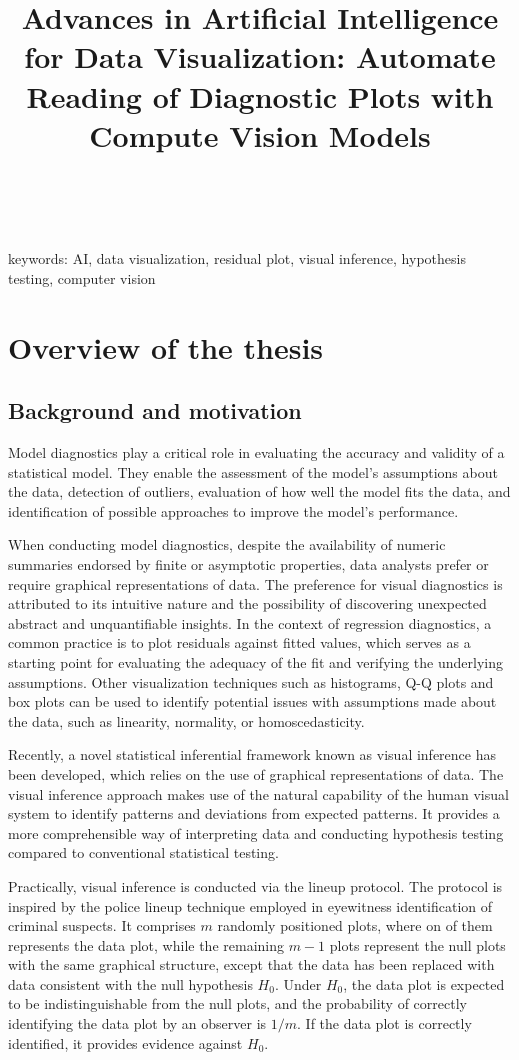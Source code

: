 \documentclass[11pt,a4paper,]{article}
\title{Advances in Artificial Intelligence for Data Visualization: Automate Reading of Diagnostic Plots with Compute Vision Models}
\author{\sf{\Large\textbf{Weihao (Patrick) Li}\\\large PhD student\\[0.5cm]}}
\date{\sf\Date~\Month~\Year}
\makeatletter
\def\titlepage{\front{\expandafter{\@title}}{\@author}{\@organization}}
\makeatother
\begin{document}
\titlepage

keywords:
AI, data visualization, residual plot, visual inference, hypothesis testing, computer vision

\hypertarget{overview-of-the-thesis}{%
\section{Overview of the thesis}\label{overview-of-the-thesis}}

\hypertarget{background-and-motivation}{%
\subsection{Background and motivation}\label{background-and-motivation}}

Model diagnostics play a critical role in evaluating the accuracy and validity of a statistical model. They enable the assessment of the model's assumptions about the data, detection of outliers, evaluation of how well the model fits the data, and identification of possible approaches to improve the model's performance.

When conducting model diagnostics, despite the availability of numeric summaries endorsed by finite or asymptotic properties, data analysts prefer or require graphical representations of data. The preference for visual diagnostics is attributed to its intuitive nature and the possibility of discovering unexpected abstract and unquantifiable insights. In the context of regression diagnostics, a common practice is to plot residuals against fitted values, which serves as a starting point for evaluating the adequacy of the fit and verifying the underlying assumptions. Other visualization techniques such as histograms, Q-Q plots and box plots can be used to identify potential issues with assumptions made about the data, such as linearity, normality, or homoscedasticity.

Recently, a novel statistical inferential framework known as visual inference \autocite{buja_statistical_2009} has been developed, which relies on the use of graphical representations of data. The visual inference approach makes use of the natural capability of the human visual system to identify patterns and deviations from expected patterns. It provides a more comprehensible way of interpreting data and conducting hypothesis testing compared to conventional statistical testing.

Practically, visual inference is conducted via the lineup protocol. The protocol is inspired by the police lineup technique employed in eyewitness identification of criminal suspects. It comprises \(m\) randomly positioned plots, where on of them represents the data plot, while the remaining \(m - 1\) plots represent the null plots with the same graphical structure, except that the data has been replaced with data consistent with the null hypothesis \(H_0\). Under \(H_0\), the data plot is expected to be indistinguishable from the null plots, and the probability of correctly identifying the data plot by an observer is \(1/m\). If the data plot is correctly identified, it provides evidence against \(H_0\).
\end{document}
